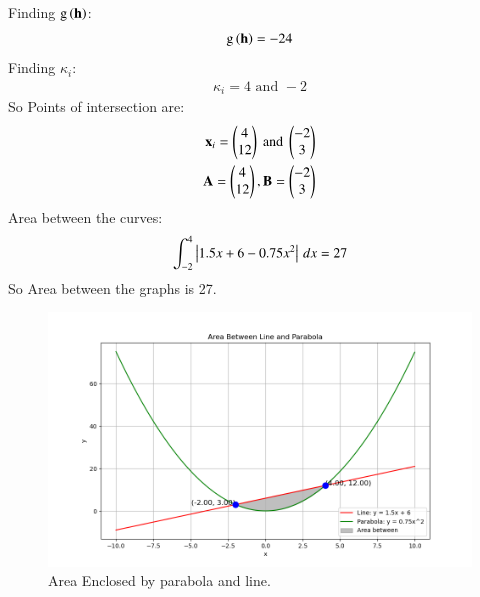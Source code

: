 \documentclass[journal]{IEEEtran}
\numberwithin{equation}{enumi}
\numberwithin{figure}{enumi}
\begin{document}
Finding $\text{g}\left(\mathbf{h}\right)$:
\begin{align}
	\text{g}\left(\mathbf{h}\right)=-24
\end{align}
Finding $\kappa_i$:
\begin{align}
	\kappa_i=4 \text{ and } -2
\end{align}
So Points of intersection are:
\begin{align}
	\mathbf{x}_i=\begin{pmatrix}4\\12\end{pmatrix} \text{ and } \begin{pmatrix}-2\\3\end{pmatrix}\\
 \mathbf{A}=\begin{pmatrix}4\\12\end{pmatrix} , \mathbf{B}=\begin{pmatrix}-2\\3\end{pmatrix}
\end{align}
Area between the curves:
\begin{align}
     \int_{-2}^{4}\left\vert1.5x+6-0.75x^2\right\vert\,dx =27
\end{align}
So Area between the graphs is 27.\\
\begin{figure}[h!]
   \centering
   \includegraphics[width=0.9\linewidth]{Figure_1.png}
	\caption{Area Enclosed by parabola and line. }
   \label{stemplot}
\end{figure}
\end{document}
